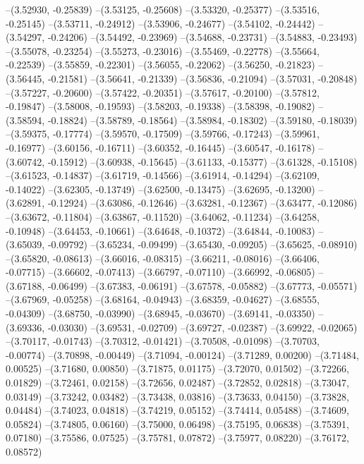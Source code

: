 --(3.52930, -0.25839)
--(3.53125, -0.25608)
--(3.53320, -0.25377)
--(3.53516, -0.25145)
--(3.53711, -0.24912)
--(3.53906, -0.24677)
--(3.54102, -0.24442)
--(3.54297, -0.24206)
--(3.54492, -0.23969)
--(3.54688, -0.23731)
--(3.54883, -0.23493)
--(3.55078, -0.23254)
--(3.55273, -0.23016)
--(3.55469, -0.22778)
--(3.55664, -0.22539)
--(3.55859, -0.22301)
--(3.56055, -0.22062)
--(3.56250, -0.21823)
--(3.56445, -0.21581)
--(3.56641, -0.21339)
--(3.56836, -0.21094)
--(3.57031, -0.20848)
--(3.57227, -0.20600)
--(3.57422, -0.20351)
--(3.57617, -0.20100)
--(3.57812, -0.19847)
--(3.58008, -0.19593)
--(3.58203, -0.19338)
--(3.58398, -0.19082)
--(3.58594, -0.18824)
--(3.58789, -0.18564)
--(3.58984, -0.18302)
--(3.59180, -0.18039)
--(3.59375, -0.17774)
--(3.59570, -0.17509)
--(3.59766, -0.17243)
--(3.59961, -0.16977)
--(3.60156, -0.16711)
--(3.60352, -0.16445)
--(3.60547, -0.16178)
--(3.60742, -0.15912)
--(3.60938, -0.15645)
--(3.61133, -0.15377)
--(3.61328, -0.15108)
--(3.61523, -0.14837)
--(3.61719, -0.14566)
--(3.61914, -0.14294)
--(3.62109, -0.14022)
--(3.62305, -0.13749)
--(3.62500, -0.13475)
--(3.62695, -0.13200)
--(3.62891, -0.12924)
--(3.63086, -0.12646)
--(3.63281, -0.12367)
--(3.63477, -0.12086)
--(3.63672, -0.11804)
--(3.63867, -0.11520)
--(3.64062, -0.11234)
--(3.64258, -0.10948)
--(3.64453, -0.10661)
--(3.64648, -0.10372)
--(3.64844, -0.10083)
--(3.65039, -0.09792)
--(3.65234, -0.09499)
--(3.65430, -0.09205)
--(3.65625, -0.08910)
--(3.65820, -0.08613)
--(3.66016, -0.08315)
--(3.66211, -0.08016)
--(3.66406, -0.07715)
--(3.66602, -0.07413)
--(3.66797, -0.07110)
--(3.66992, -0.06805)
--(3.67188, -0.06499)
--(3.67383, -0.06191)
--(3.67578, -0.05882)
--(3.67773, -0.05571)
--(3.67969, -0.05258)
--(3.68164, -0.04943)
--(3.68359, -0.04627)
--(3.68555, -0.04309)
--(3.68750, -0.03990)
--(3.68945, -0.03670)
--(3.69141, -0.03350)
--(3.69336, -0.03030)
--(3.69531, -0.02709)
--(3.69727, -0.02387)
--(3.69922, -0.02065)
--(3.70117, -0.01743)
--(3.70312, -0.01421)
--(3.70508, -0.01098)
--(3.70703, -0.00774)
--(3.70898, -0.00449)
--(3.71094, -0.00124)
--(3.71289, 0.00200)
--(3.71484, 0.00525)
--(3.71680, 0.00850)
--(3.71875, 0.01175)
--(3.72070, 0.01502)
--(3.72266, 0.01829)
--(3.72461, 0.02158)
--(3.72656, 0.02487)
--(3.72852, 0.02818)
--(3.73047, 0.03149)
--(3.73242, 0.03482)
--(3.73438, 0.03816)
--(3.73633, 0.04150)
--(3.73828, 0.04484)
--(3.74023, 0.04818)
--(3.74219, 0.05152)
--(3.74414, 0.05488)
--(3.74609, 0.05824)
--(3.74805, 0.06160)
--(3.75000, 0.06498)
--(3.75195, 0.06838)
--(3.75391, 0.07180)
--(3.75586, 0.07525)
--(3.75781, 0.07872)
--(3.75977, 0.08220)
--(3.76172, 0.08572)
